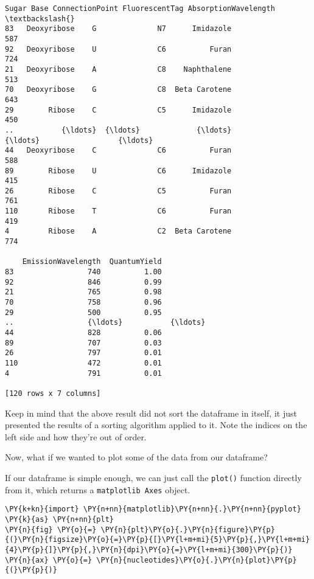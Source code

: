             \begin{tcolorbox}[breakable, size=fbox, boxrule=.5pt, pad at break*=1mm, opacityfill=0]
\begin{Verbatim}[commandchars=\\\{\}]
           Sugar Base ConnectionPoint FluorescentTag AbsorptionWavelength  \textbackslash{}
83   Deoxyribose    G              N7      Imidazole                  587
92   Deoxyribose    U              C6          Furan                  724
21   Deoxyribose    A              C8    Naphthalene                  513
70   Deoxyribose    G              C8  Beta Carotene                  643
29        Ribose    C              C5      Imidazole                  450
..           {\ldots}  {\ldots}             {\ldots}            {\ldots}                  {\ldots}
44   Deoxyribose    C              C6          Furan                  588
89        Ribose    U              C6      Imidazole                  415
26        Ribose    C              C5          Furan                  761
110       Ribose    T              C6          Furan                  419
4         Ribose    A              C2  Beta Carotene                  774

    EmissionWavelength  QuantumYield
83                 740          1.00
92                 846          0.99
21                 765          0.98
70                 758          0.96
29                 500          0.95
..                 {\ldots}           {\ldots}
44                 828          0.06
89                 707          0.03
26                 797          0.01
110                472          0.01
4                  791          0.01

[120 rows x 7 columns]
\end{Verbatim}
\end{tcolorbox}
        
    Keep in mind that the above result did not sort the dataframe in itself,
it just presented the results of a sorting algorithm applied to it. Note
the indices on the left side and how they're out of order.

Now, what if we wanted to plot some of the data from our dataframe?

If our dataframe is simple enough, we can just call the \texttt{plot()}
function directly from it, which returns a \texttt{matplotlib\ Axes}
object.

    \begin{tcolorbox}[breakable, size=fbox, boxrule=1pt, pad at break*=1mm,colback=cellbackground, colframe=cellborder]
\begin{Verbatim}[commandchars=\\\{\}]
\PY{k+kn}{import} \PY{n+nn}{matplotlib}\PY{n+nn}{.}\PY{n+nn}{pyplot} \PY{k}{as} \PY{n+nn}{plt}
\PY{n}{fig} \PY{o}{=} \PY{n}{plt}\PY{o}{.}\PY{n}{figure}\PY{p}{(}\PY{n}{figsize}\PY{o}{=}\PY{p}{[}\PY{l+m+mi}{5}\PY{p}{,}\PY{l+m+mi}{4}\PY{p}{]}\PY{p}{,}\PY{n}{dpi}\PY{o}{=}\PY{l+m+mi}{300}\PY{p}{)}
\PY{n}{ax} \PY{o}{=} \PY{n}{nucleotides}\PY{o}{.}\PY{n}{plot}\PY{p}{(}\PY{p}{)}
\end{Verbatim}
\end{tcolorbox}

